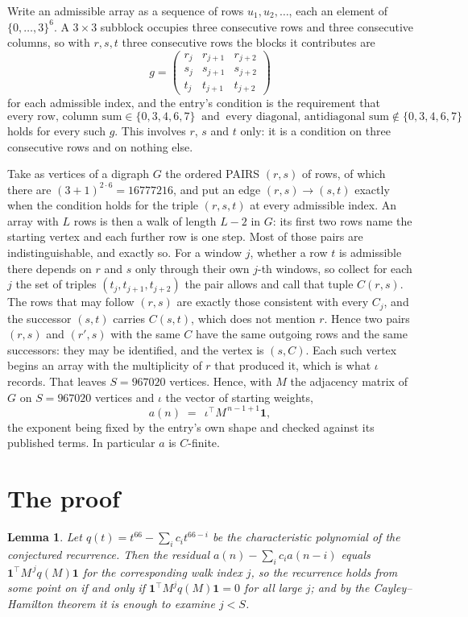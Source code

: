 \documentclass[11pt,a4paper]{article}
\theoremstyle{plain}
\newtheorem{lemma}[theorem]{Lemma}
\theoremstyle{definition}
\begin{document}
Write an admissible array as a sequence of rows $u_1,u_2,\dots$, each an element of
$\{0,\dots,3\}^{6}$. A $3\times3$ subblock occupies three consecutive rows and
three consecutive columns, so with $r,s,t$ three consecutive rows the blocks it
contributes are
\[
g=\begin{pmatrix}r_j&r_{j+1}&r_{j+2}\\ s_j&s_{j+1}&s_{j+2}\\ t_j&t_{j+1}&t_{j+2}\end{pmatrix}
\]
for each admissible index, and the entry's condition is the requirement that
\[
\text{every row, column sum} \in \{0,3,4,6,7\}\ \text{ and }\ \text{every diagonal, antidiagonal sum} \notin \{0,3,4,6,7\}
\]
holds for every such $g$. This involves $r$, $s$ and $t$ only: it is a condition on
three consecutive rows and on nothing else.

Take as vertices of a digraph $G$ the ordered PAIRS $(r,s)$ of rows, of which there are
$(3+1)^{2\cdot6}=16777216$, and put an edge $(r,s)\to(s,t)$ exactly when the condition
holds for the triple $(r,s,t)$ at every admissible index. An array with $L$ rows is then a
walk of length $L-2$ in $G$: its first two rows name the starting vertex and each further
row is one step. Most of those pairs are indistinguishable, and exactly so. For a window $j$, whether a row $t$ is admissible there depends on $r$ and $s$ only through their own $j$-th windows, so collect for each $j$ the set of triples $(t_j,t_{j+1},t_{j+2})$ the pair allows and call that tuple $C(r,s)$. The rows that may follow $(r,s)$ are exactly those consistent with every $C_j$, and the successor $(s,t)$ carries $C(s,t)$, which does not mention $r$. Hence two pairs $(r,s)$ and $(r',s)$ with the same $C$ have the same outgoing rows and the same successors: they may be identified, and the vertex is $(s,C)$. Each such vertex begins an array with the multiplicity of $r$ that produced it, which is what $\iota$ records. That leaves $S=967020$ vertices. Hence, with $M$ the adjacency matrix of $G$ on $S=967020$ vertices and
$\iota$ the vector of starting weights,
\[
a(n)\;=\;\,\iota^{\!\top}M^{\,n-1+1}\mathbf{1},
\]
the exponent being fixed by the entry's own shape and checked against its published terms.
In particular $a$ is $C$-finite.

\section{The proof}

\begin{lemma}\label{lem:crit}
Let $q(t)=t^{66}-\sum_i c_it^{66-i}$ be the characteristic polynomial of the
conjectured recurrence. Then the residual $a(n)-\sum_ic_ia(n-i)$ equals
$\mathbf{1}^{\!\top}M^{\,j}q(M)\mathbf{1}$ for the corresponding walk index
$j$, so the recurrence holds from some point on if and only if
$\mathbf{1}^{\!\top}M^{j}q(M)\mathbf{1}=0$ for all large $j$; and by the
Cayley--Hamilton theorem it is enough to examine $j<S$.
\end{lemma}
\end{document}
